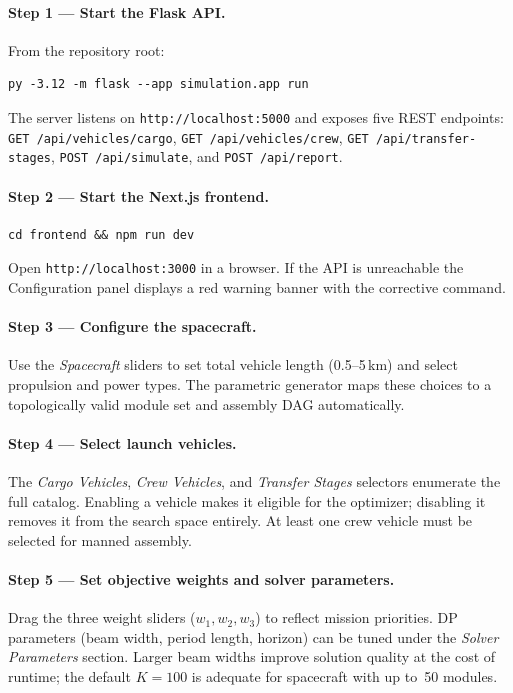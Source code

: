 \paragraph{Step 1 — Start the Flask API.}
From the repository root:
\begin{verbatim}
py -3.12 -m flask --app simulation.app run
\end{verbatim}
The server listens on \texttt{http://localhost:5000} and exposes
five REST endpoints: \texttt{GET /api/vehicles/cargo},
\texttt{GET /api/vehicles/crew}, \texttt{GET /api/transfer-stages},
\texttt{POST /api/simulate}, and \texttt{POST /api/report}.

\paragraph{Step 2 — Start the Next.js frontend.}
\begin{verbatim}
cd frontend && npm run dev
\end{verbatim}
Open \texttt{http://localhost:3000} in a browser.
If the API is unreachable the Configuration panel displays a
red warning banner with the corrective command.

\paragraph{Step 3 — Configure the spacecraft.}
Use the \emph{Spacecraft} sliders to set total vehicle length
(0.5--5\,km) and select propulsion and power types. The
parametric generator maps these choices to a topologically valid
module set and assembly DAG automatically.

\paragraph{Step 4 — Select launch vehicles.}
The \emph{Cargo Vehicles}, \emph{Crew Vehicles}, and
\emph{Transfer Stages} selectors enumerate the full catalog.
Enabling a vehicle makes it eligible for the optimizer; disabling
it removes it from the search space entirely. At least one crew
vehicle must be selected for manned assembly.

\paragraph{Step 5 — Set objective weights and solver parameters.}
Drag the three weight sliders ($w_1, w_2, w_3$) to reflect
mission priorities. DP parameters (beam width, period length,
horizon) can be tuned under the \emph{Solver Parameters}
section. Larger beam widths improve solution quality at the cost
of runtime; the default $K = 100$ is adequate for spacecraft
with up to~50 modules.

